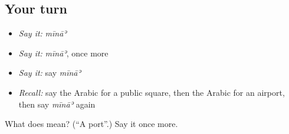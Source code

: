 \subsection*{Your turn}
\begin{itemize}
\raggedright
  \item \emph{Say it:} \emph{mīnāʾ}
  \item \emph{Say it:} \emph{mīnāʾ}, once more
  \item \emph{Say it:} say \emph{mīnāʾ}
  \item \emph{Recall:} say the Arabic for a public square, then the Arabic for an airport, then say \emph{mīnāʾ} again
\end{itemize}

\begin{tcolorbox}[breakable,colback=teal!4,colframe=teal!35!black,title={Before you move on}]
What does  mean? (\textquotedblleft{}A port\textquotedblright{}.) Say it once more.
\end{tcolorbox}
